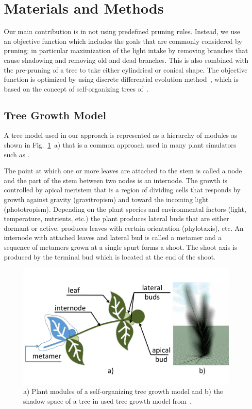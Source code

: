 \section{Materials and Methods}\label{sec:intro}
Our main contribution is in not using predefined pruning rules.
Instead, we use an objective function which includes the goals that are commonly considered by pruning; in particular maximization of the light intake by removing branches that cause shadowing and removing old and dead branches. This is also combined with the pre-pruning of a tree to take either cylindrical or conical shape. 
The objective function is optimized by using discrete differential evolution method~\cite{kohek_eduapple:_2015}, which is based on the
concept of self-organizing trees of~\cite{palubicki_self-organizing_2009}.


\subsection{Tree Growth Model}
A tree model used in our approach is represented as a hierarchy of
modules as shown in Fig.~\ref{fig:my_figure1}~a) that is a common approach used in many plant
simulators such as \cite{de_reffye_plant_1988,palubicki_self-organizing_2009,pirk_plastic_2012,prusinkiewicz_development_1988,stava_inverse_2014}. 

The point at which one or more leaves are attached to the stem is called a node and the part of the stem between two nodes is an internode. 
The growth is controlled by apical meristem that is a region of dividing cells that responds by growth against gravity (gravitropism) and
toward the incoming light (phototropism).
Depending on the plant species and environmental factors (light, temperature, nutrients, etc.) the plant produces lateral buds that are either dormant or active, produces leaves with certain orientation (phylotaxis), etc.
An internode with attached leaves and lateral bud is called a metamer and a sequence of metamers grown at a single spurt forms a shoot. 
The shoot axis is produced by the terminal bud which is located at the end of the shoot.
\begin{figure}[hbt]
    \centering
    \includegraphics[width=4.5in]{figs/Fig1}
    \caption{a) Plant modules of a self-organizing tree growth
model and b) the shadow space of a tree in used tree growth model from~\cite{kohek_eduapple:_2015}.}
    \label{fig:my_figure1}
\end{figure}


